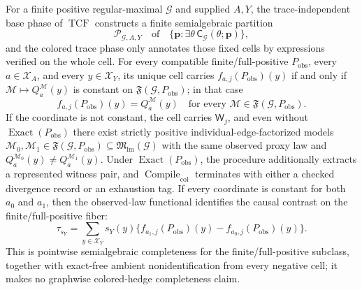 For a finite positive regular-maximal \(\mathcal G\) and supplied \(A,Y\), the trace-independent base phase of \(\operatorname{TCF}\) constructs a finite semialgebraic partition
\[
\mathscr P_{\mathcal G,A,Y}
\quad\text{of}\quad
\{\mathbf p:\exists\theta\,\mathsf C_{\mathcal G}(\theta;\mathbf p)\},
\]
and the colored trace phase only annotates those fixed cells by expressions verified on the whole cell. For every compatible finite/full-positive \(P_{\mathrm{obs}}\), every \(a\in\mathcal X_A\), and every \(y\in\mathcal X_Y\), its unique cell carries \(f_{a,j}(P_{\mathrm{obs}})(y)\) if and only if \(\mathcal M\mapsto Q_a^{\mathcal M}(y)\) is constant on \(\mathfrak F(\mathcal G,P_{\mathrm{obs}})\); in that case
\[
f_{a,j}(P_{\mathrm{obs}})(y)=Q_a^{\mathcal M}(y)
\quad\text{for every }\mathcal M\in\mathfrak F(\mathcal G,P_{\mathrm{obs}}).
\]
If the coordinate is not constant, the cell carries \(\mathsf W_j\), and even without \(\operatorname{Exact}(P_{\mathrm{obs}})\) there exist strictly positive individual-edge-factorized models \(\mathcal M_0,\mathcal M_1\in\mathfrak F(\mathcal G,P_{\mathrm{obs}})\subseteq\mathfrak M_{\mathrm{lm}}(\mathcal G)\) with the same observed proxy law and \(Q_a^{\mathcal M_0}(y)\neq Q_a^{\mathcal M_1}(y)\). Under \(\operatorname{Exact}(P_{\mathrm{obs}})\), the procedure additionally extracts a represented witness pair, and \(\operatorname{Compile}_{\mathrm{col}}\) terminates with either a checked divergence record or an exhaustion tag. If every coordinate is constant for both \(a_0\) and \(a_1\), then the observed-law functional identifies the causal contrast on the finite/full-positive fiber:
\[
\tau_{s_Y}
=\sum_{y\in\mathcal X_Y}s_Y(y)
\{f_{a_1,j}(P_{\mathrm{obs}})(y)-f_{a_0,j}(P_{\mathrm{obs}})(y)\}.
\]
This is pointwise semialgebraic completeness for the finite/full-positive subclass, together with exact-free ambient nonidentification from every negative cell; it makes no graphwise colored-hedge completeness claim.